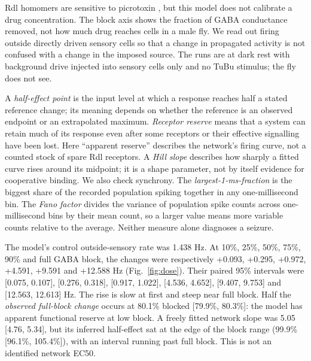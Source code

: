 \documentclass[11pt]{article}
\begin{document}
Rdl homomers are sensitive to picrotoxin \cite{zhang}, but this model does not calibrate a drug concentration. The block axis shows the fraction of GABA conductance removed, not how much drug reaches cells in a male fly. We read out firing outside directly driven sensory cells so that a change in propagated activity is not confused with a change in the imposed source. The runs are at dark rest with background drive injected into sensory cells only and no TuBu stimulus; the fly does not see.

A \emph{half-effect point} is the input level at which a response reaches half a stated reference change; its meaning depends on whether the reference is an observed endpoint or an extrapolated maximum. \emph{Receptor reserve} means that a system can retain much of its response even after some receptors or their effective signalling have been lost. Here ``apparent reserve'' describes the network's firing curve, not a counted stock of spare Rdl receptors. A \emph{Hill slope} describes how sharply a fitted curve rises around its midpoint; it is a shape parameter, not by itself evidence for cooperative binding. We also check synchrony. The \emph{largest-1-ms-fraction} is the biggest share of the recorded population spiking together in any one-millisecond bin. The \emph{Fano factor} divides the variance of population spike counts across one-millisecond bins by their mean count, so a larger value means more variable counts relative to the average. Neither measure alone diagnoses a seizure.

The model's control outside-sensory rate was 1.438 Hz. At 10\%, 25\%, 50\%, 75\%, 90\% and full GABA block, the changes were respectively +0.093, +0.295, +0.972, +4.591, +9.591 and +12.588 Hz (Fig.~\ref{fig:dose}). Their paired 95\% intervals were [0.075, 0.107], [0.276, 0.318], [0.917, 1.022], [4.536, 4.652], [9.407, 9.753] and [12.563, 12.613] Hz. The rise is slow at first and steep near full block. Half the \emph{observed full-block change} occurs at 80.1\% blocked [79.9\%, 80.3\%]: the model has apparent functional reserve at low block. A freely fitted network slope was 5.05 [4.76, 5.34], but its inferred half-effect sat at the edge of the block range (99.9\% [96.1\%, 105.4\%]), with an interval running past full block. This is not an identified network EC50.
\end{document}
